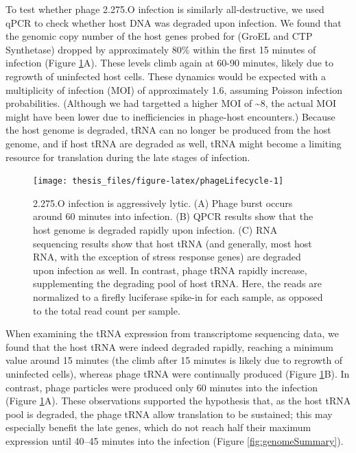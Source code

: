 \documentclass[12pt,twoside]{mitthesis-manusdown}
\begin{document}
To test whether phage 2.275.O infection is similarly all-destructive, we
used qPCR to check whether host DNA was degraded upon infection. We
found that the genomic copy number of the host genes probed for (GroEL
and CTP Synthetase) dropped by approximately 80\% within the first 15
minutes of infection (Figure \ref{fig:phageLifecycle}A). These levels
climb again at 60-90 minutes, likely due to regrowth of uninfected host
cells. These dynamics would be expected with a multiplicity of infection
(MOI) of approximately 1.6, assuming Poisson infection probabilities.
(Although we had targetted a higher MOI of \textasciitilde{}8, the
actual MOI might have been lower due to inefficiencies in phage-host
encounters.) Because the host genome is degraded, tRNA can no longer be
produced from the host genome, and if host tRNA are degraded as well,
tRNA might become a limiting resource for translation during the late
stages of infection.
\begin{figure}[tb!]

{\centering \texttt{[image: thesis\_files/figure-latex/phageLifecycle-1]} 

}

\caption{\label{fig:phageLifecycle}2.275.O infection is aggressively lytic. (A) Phage burst occurs around 60 minutes into infection. (B) QPCR results show that the host genome is degraded rapidly upon infection. (C) RNA sequencing results show that host tRNA (and generally, most host RNA, with the exception of stress response genes) are degraded upon infection as well. In contrast, phage tRNA rapidly increase, supplementing the degrading pool of host tRNA. Here, the reads are normalized to a firefly luciferase spike-in for each sample, as opposed to the total read count per sample.}\label{fig:phageLifecycle}
\end{figure}
When examining the tRNA expression from transcriptome sequencing data,
we found that the host tRNA were indeed degraded rapidly, reaching a
minimum value around 15 minutes (the climb after 15 minutes is likely
due to regrowth of uninfected cells), whereas phage tRNA were
continually produced (Figure \ref{fig:phageLifecycle}B). In contrast,
phage particles were produced only 60 minutes into the infection (Figure
\ref{fig:phageLifecycle}A). These observations supported the hypothesis
that, as the host tRNA pool is degraded, the phage tRNA allow
translation to be sustained; this may especially benefit the late genes,
which do not reach half their maximum expression until 40--45 minutes
into the infection (Figure \ref{fig:genomeSummary}).
\end{document}
